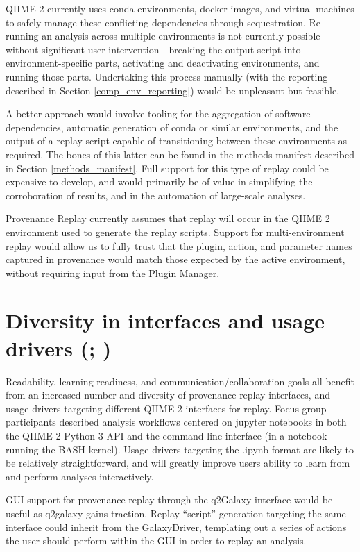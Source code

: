 QIIME 2 currently uses conda environments, docker images, and virtual machines
to safely manage these conflicting dependencies through sequestration.
Re-running an analysis across multiple environments is not currently possible
without significant user intervention - breaking the output script into
environment-specific parts, activating and deactivating environments, and
running those parts. Undertaking this process manually (with the reporting
described in Section \ref{comp_env_reporting}) would be unpleasant but feasible.

A better approach would involve tooling for the aggregation of software
dependencies, automatic generation of conda or similar environments, and the
output of a replay script capable of transitioning between these environments as
required. The bones of this latter can be found in the methods manifest
described in Section \ref{methods_manifest}. Full support for this type of
replay could be expensive to develop, and would primarily be of value in
simplifying the corroboration of results, and in the automation of large-scale
analyses. 

Provenance Replay currently assumes that replay will occur in the QIIME 2
environment used to generate the replay scripts. Support for multi-environment
replay would allow us to fully trust that the plugin, action, and parameter
names captured in provenance would match those expected by the active
environment, without requiring input from the Plugin Manager.

\section{Diversity in interfaces and usage drivers (\cite[Issue 65]{keefe_issues_2021}; \cite[Issue 79]{keefe_issues_2021})}

Readability, learning-readiness, and communication/collaboration goals all
benefit from an increased number and diversity of provenance replay interfaces,
and usage drivers targeting different QIIME 2 interfaces for replay. Focus group
participants described analysis workflows centered on jupyter notebooks in both
the QIIME 2 Python 3 API and the command line interface (in a notebook running
the BASH kernel). Usage drivers targeting the .ipynb format are likely to be
relatively straightforward, and will greatly improve users ability to learn from
and perform analyses interactively.

GUI support for provenance replay through the q2Galaxy interface would be useful
as q2galaxy gains traction. Replay “script” generation targeting the same
interface could inherit from the GalaxyDriver, templating out a series of
actions the user should perform within the GUI in order to replay an analysis.

